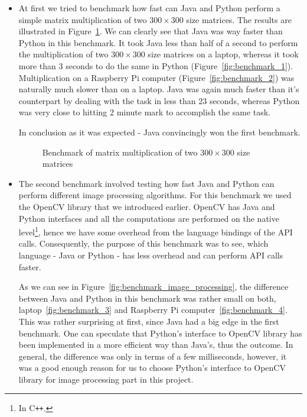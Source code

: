 \begin{itemize}
\item At first we tried to benchmark how fast can Java and Python perform a simple matrix multiplication of two $300 \times 300$ size matrices. The results are illustrated in Figure~\ref{fig:benchmark_multiplication}. We can clearly see that Java was way faster than Python in this benchmark. It took Java less than half of a second to perform the multiplication of two $300 \times 300$ size matrices on a laptop, whereas it took more than 3 seconds to do the same in Python (Figure~\ref{fig:benchmark_1}). Multiplication on a Raspberry Pi computer (Figure~\ref{fig:benchmark_2}) was naturally much slower than on a laptop. Java was again much faster than it's counterpart by dealing with the task in less than 23 seconds, whereas Python was very close to hitting 2 minute mark to accomplish the same task.

In conclusion as it was expected - Java convincingly won the first benchmark.

\begin{figure}[htb]
		\centering
		\quad
		\caption{Benchmark of matrix multiplication of two $300 \times 300$ size matrices}
		\label{fig:benchmark_multiplication}
\end{figure}

\item The second benchmark involved testing how fast Java and Python can perform different image processing algorithms. For this benchmark we used the OpenCV library that we introduced earlier. OpenCV has Java and Python interfaces and all the computations are performed on the native level\footnote{In C\texttt{++}.}, hence we have some overhead from the language bindings of the API calls. Consequently, the purpose of this benchmark was to see, which language - Java or Python - has less overhead and can perform API calls faster. 

As we can see in Figure~\ref{fig:benchmark_image_processing}, the difference between Java and Python in this benchmark was rather small on both, laptop~\ref{fig:benchmark_3} and Raspberry Pi computer~\ref{fig:benchmark_4}. This was rather surprising at first, since Java had a big edge in the first benchmark. One can speculate that Python's interface to OpenCV library has been implemented in a more efficient way than Java's, thus the outcome. In general, the difference was only in terms of a few milliseconds, however, it was a good enough reason for us to choose Python's interface to OpenCV library for image processing part in this project.


\end{itemize}
